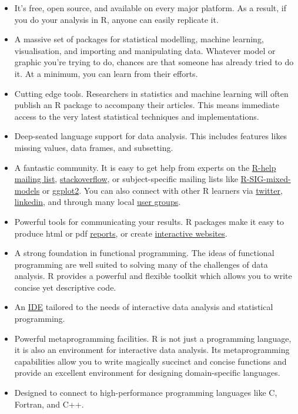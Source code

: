 \begin{itemize}
\item
  It's free, open source, and available on every major platform. As a
  result, if you do your analysis in R, anyone can easily replicate it.
\item
  A massive set of packages for statistical modelling, machine learning,
  visualisation, and importing and manipulating data. Whatever model or
  graphic you're trying to do, chances are that someone has already
  tried to do it. At a minimum, you can learn from their efforts.
\item
  Cutting edge tools. Researchers in statistics and machine learning
  will often publish an R package to accompany their articles. This
  means immediate access to the very latest statistical techniques and
  implementations.
\item
  Deep-seated language support for data analysis. This includes features
  likes missing values, data frames, and subsetting.
\item
  A fantastic community. It is easy to get help from experts on the
  \href{https://stat.ethz.ch/mailman/listinfo/r-help}{R-help mailing
  list},
  \href{http://stackoverflow.com/questions/tagged/r}{stackoverflow}, or
  subject-specific mailing lists like
  \href{https://stat.ethz.ch/mailman/listinfo/r-sig-mixed-models}{R-SIG-mixed-models}
  or \href{https://groups.google.com/forum/\#!forum/ggplot2}{ggplot2}.
  You can also connect with other R learners via
  \href{https://twitter.com/search?q=\%23rstats}{twitter},
  \href{http://www.linkedin.com/groups/R-Project-Statistical-Computing-77616}{linkedin},
  and through many local
  \href{http://blog.revolutionanalytics.com/local-r-groups.html}{user
  groups}.
\item
  Powerful tools for communicating your results. R packages make it easy
  to produce html or pdf \href{http://yihui.name/knitr/}{reports}, or
  create \href{http://www.rstudio.com/shiny/}{interactive websites}.
\item
  A strong foundation in functional programming. The ideas of functional
  programming are well suited to solving many of the challenges of data
  analysis. R provides a powerful and flexible toolkit which allows you
  to write concise yet descriptive code.
\item
  An \href{http://www.rstudio.com/ide/}{IDE} tailored to the needs of
  interactive data analysis and statistical programming.
\item
  Powerful metaprogramming facilities. R is not just a programming
  language, it is also an environment for interactive data analysis. Its
  metaprogramming capabilities allow you to write magically succinct and
  concise functions and provide an excellent environment for designing
  domain-specific languages.
\item
  Designed to connect to high-performance programming languages like C,
  Fortran, and C++.
\end{itemize}

